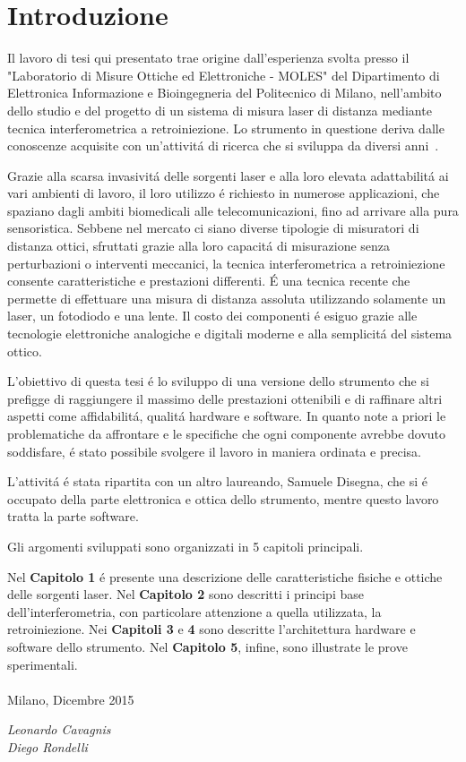 \chapter*{Introduzione}
\label{Introduzione}
\thispagestyle{empty}

Il lavoro di tesi qui presentato trae origine dall'esperienza svolta presso il "Laboratorio di Misure Ottiche ed Elettroniche - MOLES" del Dipartimento di Elettronica Informazione e Bioingegneria del Politecnico di Milano, nell'ambito dello studio e del progetto di un sistema di misura laser di distanza mediante tecnica interferometrica a retroiniezione. Lo strumento in questione deriva dalle conoscenze acquisite con un'attivit\'a di ricerca che si sviluppa da diversi anni~\cite{341714}.

Grazie alla scarsa invasivit\'a delle sorgenti laser e alla loro elevata adattabilit\'a ai vari ambienti di lavoro, il loro utilizzo \'e richiesto in numerose applicazioni, che spaziano dagli ambiti biomedicali alle telecomunicazioni, fino ad arrivare alla pura sensoristica. Sebbene nel mercato ci siano diverse tipologie di misuratori di distanza ottici, sfruttati grazie alla loro capacit\'a di misurazione senza perturbazioni o interventi meccanici, la tecnica interferometrica a retroiniezione consente caratteristiche e prestazioni differenti. \'E una tecnica recente che permette di effettuare una misura di distanza assoluta utilizzando solamente un laser, un fotodiodo e una lente. Il costo dei componenti \'e esiguo grazie alle tecnologie elettroniche analogiche e digitali moderne e alla semplicit\'a del sistema ottico.

L'obiettivo di questa tesi \'e lo sviluppo di una versione dello strumento che si prefigge di raggiungere il massimo delle prestazioni ottenibili e di raffinare altri aspetti come affidabilit\'a, qualit\'a hardware e software. In quanto note a priori le problematiche da affrontare e le specifiche che ogni componente avrebbe dovuto soddisfare, \'e stato possibile svolgere il lavoro in maniera ordinata e precisa.

L'attivit\'a \'e stata ripartita con un altro laureando, Samuele Disegna, che si \'e occupato della parte elettronica e ottica dello strumento, mentre questo lavoro tratta la parte software.

\noindent Gli argomenti sviluppati sono organizzati in 5 capitoli principali.

Nel \textbf{Capitolo 1} \'e presente una descrizione delle caratteristiche fisiche e ottiche delle sorgenti laser. Nel \textbf{Capitolo 2} sono descritti i principi base dell'interferometria, con particolare attenzione a quella utilizzata, la retroiniezione. Nei \textbf{Capitoli 3} e \textbf{4} sono descritte l'architettura hardware e software dello strumento. Nel \textbf{Capitolo 5}, infine, sono illustrate le prove sperimentali.
\\
\\
Milano, Dicembre 2015
\begin{flushright}
\textit{Leonardo Cavagnis}\\
\textit{Diego Rondelli}
\end{flushright}

